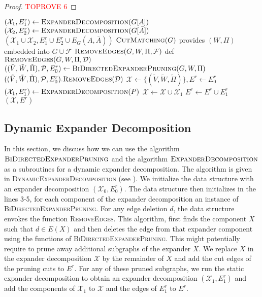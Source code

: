 \documentclass[11pt]{article}
\begin{document}
\begin{proof}\textcolor{red}{TOPROVE 6}\end{proof}

\begin{algorithm}[H]
    \begin{algorithmic}[1]
    \caption{$\textsc{ExpanderDecomposition}(G)$}\label{alg:StaticExpanderDecomposition}
    \State $(\mathcal{X}_1, E^r_1) \leftarrow \textsc{ExpanderDecomposition}(G[A])$
    \State $(\mathcal{X}_2, E^r_2) \leftarrow \textsc{ExpanderDecomposition}(G[\bar{A}])$
    \State \Return $(\mathcal{X}_1 \cup \mathcal{X}_2, E^r_1 \cup E^r_2 \cup E_G(A,\bar{A}))$
    \Else
    \State $\textsc{CutMatching}(G)$ provides $(W, \Pi)$ embedded into $G \cup \mathcal{F}$
    \State \Return $\textsc{RemoveEdges}(G, W, \Pi, \mathcal{F})$
    \EndIf
    \State 
    \State def $\textsc{RemoveEdges}(G, W, \Pi, \mathcal{D})$
    \Indent
    \State $((\tilde{V}, \tilde{W}, \tilde{\Pi}), \mathcal{P}, E^r_0) \leftarrow \textsc{BiDirectedExpanderPruning}(G, W, \Pi)$
    \State $((\tilde{V}, \tilde{W}, \tilde{\Pi}), \mathcal{P}, E^r_0).\textsc{RemoveEdges}(\mathcal{D})$
    \State $\mathcal{X} \leftarrow \{(\tilde{V}, \tilde{W}, \tilde{\Pi})\}, E^r \leftarrow E^r_0$
    \State \label{alg:SED-recursion} $(\mathcal{X}_1, E^r_1) \leftarrow \textsc{ExpanderDecomposition}(P)$
    \State $\mathcal{X} \leftarrow \mathcal{X} \cup \mathcal{X}_1$
    \State $E^r \leftarrow E^r \cup E^r_1$
    \EndFor
    \State \Return $(\mathcal{X}, E^r)$
    \EndIndent
    \end{algorithmic}
\end{algorithm}


\subsection{Dynamic Expander Decomposition}
\label{subsec:dynExpanderDecomposition}

In this section, we discuss how we can use the algorithm $\textsc{BiDirectedExpanderPruning}$ and the algorithm $\textsc{ExpanderDecomposition}$ as a subroutines for a dynamic expander decomposition. The algorithm is given in \textsc{DynamicExpanderDecomposition} (see ). We initialize the data structure with an expander decomposition $(\mathcal{X}_0, E^r_0)$. The data structure then initializes in the lines 3-5, for each component of the expander decomposition an instance of \textsc{BiDirectedExpanderPruning}. For any edge deletion $d$, the data structure envokes the function \textsc{RemoveEdges}. This algorithm, first finds the component $X$ such that $d \in E(X)$ and then deletes the edge from that expander component using the functions of \textsc{BiDirectedExpanderPruning}. This might potentially require to prune away additional subgraphs of the expander $X$. We replace $X$ in the expander decomposition $\mathcal{X}$ by the remainder of $X$ and add the cut edges of the pruning cuts to $E^r$. For any of these pruned subgraphs, we run the static expander decomposition to obtain an expander decomposition $(\mathcal{X}_1, E^r_1)$ and add the components of $\mathcal{X}_1$ to $\mathcal{X}$ and the edges of $E^r_1$ to $E^r$. 
\end{document}
